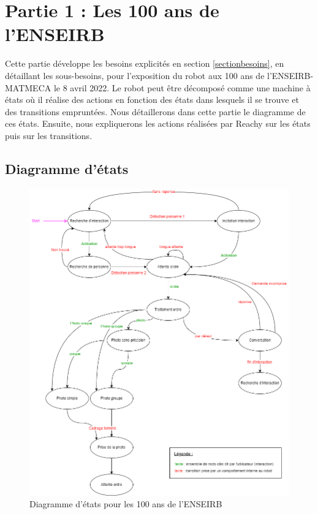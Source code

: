 \newpage


\section{Partie 1 : Les 100 ans de l'ENSEIRB} \label{sec_100_ans}
Cette partie développe les besoins explicités en section \ref{sectionbesoins}, en détaillant les sous-besoins, pour l'exposition du robot aux 100 ans de l'ENSEIRB-MATMECA le 8 avril 2022. Le robot peut être décomposé comme une machine à états où il réalise des actions en fonction des états dans lesquels il se trouve et des transitions empruntées. Nous détaillerons dans cette partie le diagramme de ces états. Ensuite, nous expliquerons les actions réalisées par Reachy sur les états puis sur les transitions.


\subsection{Diagramme d'états}
\begin{center}
    \begin{figure}[!ht]
        \includegraphics[scale = 0.55]{Diagramme-etats.png}
        \caption{Diagramme d'états pour les 100 ans de l'ENSEIRB}
        \label{fig:diag1}
        \end{figure}
\end{center}
\newpage


